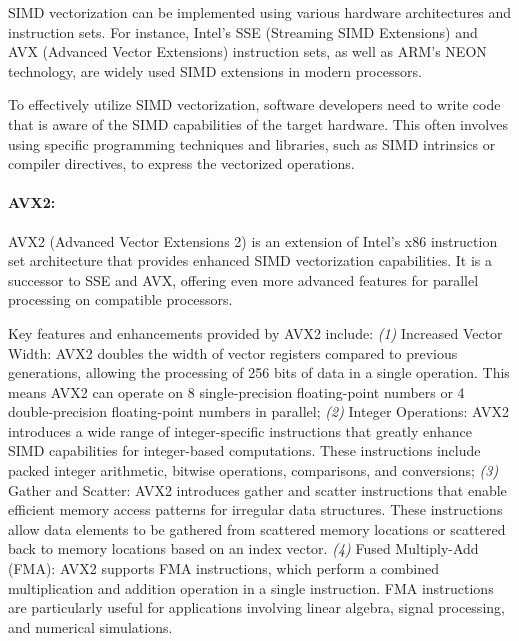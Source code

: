 SIMD vectorization can be implemented using various hardware architectures and
instruction sets. For instance, Intel's SSE (Streaming SIMD Extensions) and AVX
(Advanced Vector Extensions) instruction sets, as well as ARM's NEON
technology, are widely used SIMD extensions in modern processors.

To effectively utilize SIMD vectorization, software developers need to write
code that is aware of the SIMD capabilities of the target hardware. This often
involves using specific programming techniques and libraries, such as SIMD
intrinsics or compiler directives, to express the vectorized operations.

\paragraph{AVX2:}
AVX2 (Advanced Vector Extensions 2) is an extension of Intel's x86 instruction
set architecture that provides enhanced SIMD vectorization capabilities. It is
a successor to SSE and AVX, offering even more advanced features for parallel
processing on compatible processors.

Key features and enhancements provided by AVX2 include:
\emph{(1)} Increased Vector Width: AVX2 doubles the width of vector registers
compared to previous generations, allowing the processing of 256 bits of data
in a single operation. This means AVX2 can operate on 8 single-precision
floating-point numbers or 4 double-precision floating-point numbers in
parallel;
\emph{(2)} Integer Operations: AVX2 introduces a wide range of integer-specific
instructions that greatly enhance SIMD capabilities for integer-based
computations. These instructions include packed integer arithmetic, bitwise
operations, comparisons, and conversions;
\emph{(3)} Gather and Scatter: AVX2 introduces gather and scatter instructions
that enable efficient memory access patterns for irregular data structures.
These instructions allow data elements to be gathered from scattered memory
locations or scattered back to memory locations based on an index vector.
\emph{(4)} Fused Multiply-Add (FMA): AVX2 supports FMA instructions, which
perform a combined multiplication and addition operation in a single
instruction. FMA instructions are particularly useful for applications
involving linear algebra, signal processing, and numerical simulations.
